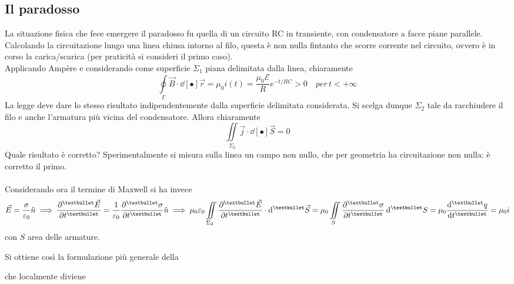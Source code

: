 \subsection{Il paradosso}
La situazione fisica che fece emergere il paradosso fu quella di un circuito RC in transiente, con condensatore a facce piane parallele. Calcolando la circuitazione lungo una linea chiusa intorno al filo, questa è non nulla fintanto che scorre corrente nel circuito, ovvero è in corso la carica/scarica (per praticità si consideri il primo caso).
\\Applicando Ampère e considerando come superficie $\Sigma_1$ piana delimitata dalla linea, chiaramente
\[\oint\limits_\Gamma \vec{B} \cdot \dd[•]{\vec{r}} = \mu_0 i(t) = \frac{\mu_0 \mathcal{E}}{R} e^{-t/RC} > 0 \quad per \, t < +\infty\]
La legge deve dare lo stesso risultato indipendentemente dalla superficie delimitata considerata. Si scelga dunque $\Sigma_2$ tale da racchiudere il filo e anche l'armatura più vicina del condensatore. Allora chiaramente
\[\iint\limits_{\Sigma_2} \vec{j} \cdot \dd[•]{\vec{S}} = 0\]
Quale risultato è corretto? Sperimentalmente si misura sulla linea un campo non nullo, che per geometria ha circuitazione non nulla: è corretto il primo.
\\~\\
Considerando ora il termine di Maxwell si ha invece
\[\vec{E} = \frac{\sigma}{\varepsilon_0} \hat{n} \implies \pdv[•]{\vec{E}}{t} = \frac{1}{\varepsilon_0} \pdv[•]{\sigma}{t} \hat{n} \implies \mu_0 \varepsilon_0 \iint\limits_{\Sigma_2} \pdv[•]{\vec{E}}{t} \cdot \dd[•]{\vec{S}} = \mu_0 \iint\limits_{S} \pdv[•]{\sigma}{t} \dd[•]{S} = \mu_0 \dv[•]{q}{t} = \mu_0 i \]
con $S$ area delle armature.


Si ottiene così la formulazione più generale della


che localmente diviene

